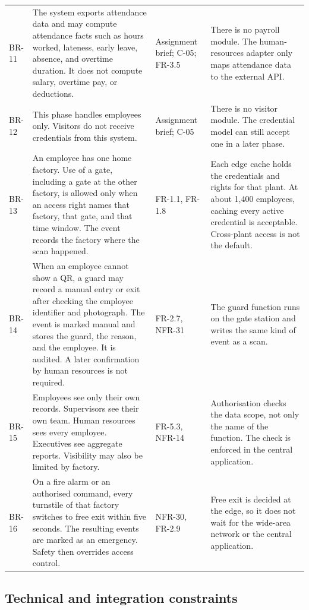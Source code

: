 \begin{longtable}{@{}L{1.25cm}L{5.15cm}L{4.05cm}L{4.15cm}@{}}
BR-11 &
The system exports attendance data and may compute attendance facts such as hours worked, lateness, early leave, absence, and overtime duration.
It does not compute salary, overtime pay, or deductions. &
Assignment brief; C-05; FR-3.5 &
There is no payroll module.
The human-resources adapter only maps attendance data to the external API.\\
\addlinespace
BR-12 &
This phase handles employees only.
Visitors do not receive credentials from this system. &
Assignment brief; C-05 &
There is no visitor module.
The credential model can still accept one in a later phase.\\
\addlinespace
BR-13 &
An employee has one home factory.
Use of a gate, including a gate at the other factory, is allowed only when an access right names that factory, that gate, and that time window.
The event records the factory where the scan happened. &
FR-1.1, FR-1.8 &
Each edge cache holds the credentials and rights for that plant.
At about 1{,}400 employees, caching every active credential is acceptable.
Cross-plant access is not the default.\\
\addlinespace
BR-14 &
When an employee cannot show a QR, a guard may record a manual entry or exit after checking the employee identifier and photograph.
The event is marked manual and stores the guard, the reason, and the employee.
It is audited.
A later confirmation by human resources is not required. &
FR-2.7, NFR-31 &
The guard function runs on the gate station and writes the same kind of event as a scan.\\
\addlinespace
BR-15 &
Employees see only their own records.
Supervisors see their own team.
Human resources sees every employee.
Executives see aggregate reports.
Visibility may also be limited by factory. &
FR-5.3, NFR-14 &
Authorisation checks the data scope, not only the name of the function.
The check is enforced in the central application.\\
\addlinespace
BR-16 &
On a fire alarm or an authorised command, every turnstile of that factory switches to free exit within five seconds.
The resulting events are marked as an emergency.
Safety then overrides access control. &
NFR-30, FR-2.9 &
Free exit is decided at the edge, so it does not wait for the wide-area network or the central application.\\
\bottomrule
\end{longtable}

\subsection{Technical and integration constraints}

